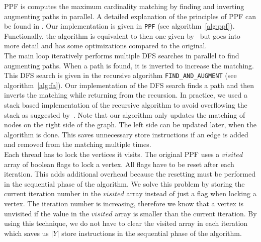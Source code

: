 \documentclass[letterpaper]{article}
\begin{document}
PPF is computes the maximum cardinality matching by finding and inverting augmenting paths in parallel. 
A detailed explanation of the principles of PPF can be found in \cite{Azad:2012}. 
Our implementation is given in \texttt{PPF} (see algorithm~\ref{alg:ppf}). Functionally, the algorithm is equivalent to then one given by~\cite{Azad:2012} 
but goes into more detail and has some optimizations compared to the original.\\

The main loop iteratively performs multiple DFS searches in parallel to find augmenting paths. When a path is found, it is inverted to increase the matching.
This DFS search is given in the recursive algorithm \texttt{FIND\_AND\_AUGMENT} (see algorithm~\ref{alg:fa}). Our implementation of the DFS search finds a path and then inverts the matching while returning from the recursion. 
In practice, we used a stack based implementation of the recursive algorithm to avoid overflowing the stack as suggested by~\cite{Azad:2012}. 
Note that our algorithm only updates the matching of nodes on the right side of the graph. The left side can be updated later, when the algorithm is done. 
This saves unnecessary store instructions if an edge is added and removed from the matching multiple times.\\

Each thread has to lock the vertices it visits. The original PPF uses a $visited$ array of boolean flags to lock a vertex. 
All flags have to be reset after each iteration. This adds additional overhead because the resetting must be performed in the sequential phase of the algorithm.
We solve this problem by storing the current iteration number in the $visited$ array instead of just a flag when locking a vertex. The iteration number is increasing, 
therefore we know that a vertex is unvisited if the value in the $visited$ array is smaller than the current iteration. By using this technique, we do not have to clear
the visited array in each iteration which saves us $|Y|$ store instructions in the sequential phase of the algorithm.\\
\end{document}
